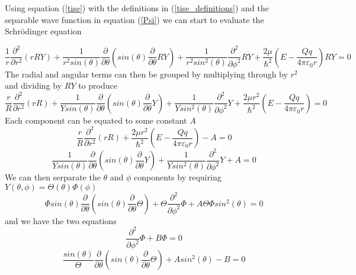 \documentclass[12pt,a4paper]{report}
\begin{document}
	Using equation (\ref{tise}) with the definitions in (\ref{tise_definitions}) and the separable wave function in equation (\ref{Psi}) we can start to evaluate the Schr{\"o}dinger equation

	\begin{equation}
		\frac{1}{r}\frac{\partial^2}{\partial r^2}\left(rRY\right)+\frac{1}{r^2 sin\left(\theta\right)}\frac{\partial}{\partial\theta}\left(sin\left(\theta\right)\frac{\partial}{\partial\theta}RY\right)+\frac{1}{r^2 sin^2\left(\theta\right)}\frac{\partial^2}{\partial\phi^2}RY+\frac{2\mu}{\hbar^2}\left(E-\frac{Qq}{4\pi\varepsilon_0 r}\right)RY=0
	\end{equation}
	The radial and angular terms can then be grouped by multiplying through by $r^2$ and dividing by $RY$ to produce
	\begin{equation}
		\frac{r}{R}\frac{\partial^2}{\partial r^2}\left(rR\right)+\frac{1}{Ysin\left(\theta\right)}\frac{\partial}{\partial\theta}\left(sin\left(\theta\right)\frac{\partial}{\partial\theta}Y\right)+\frac{1}{Ysin^2\left(\theta\right)}\frac{\partial^2}{\partial\phi^2}Y+\frac{2\mu r^2}{\hbar^2}\left(E-\frac{Qq}{4\pi\varepsilon_0 r}\right) = 0
	\end{equation}
	Each component can be equated to some constant $A$
	\begin{equation}
		\label{solve_for_E}
		\frac{r}{R}\frac{\partial^2}{\partial r^2}\left(rR\right)+\frac{2\mu r^2}{\hbar^2}\left(E-\frac{Qq}{4\pi\varepsilon_0 r}\right) -A= 0
	\end{equation}
	\begin{equation}
		\frac{1}{Ysin\left(\theta\right)}\frac{\partial}{\partial\theta}\left(sin\left(\theta\right)\frac{\partial}{\partial\theta}Y\right)+\frac{1}{Ysin^2\left(\theta\right)}\frac{\partial^2}{\partial\phi^2}Y +A = 0
	\end{equation}
	We can then serparate the $\theta$ and $\phi$ conponents by requiring $Y\left(\theta,\phi\right)=\Theta\left(\theta\right)\Phi\left(\phi\right)$
	\begin{equation}
		\Phi sin\left(\theta\right)\frac{\partial}{\partial\theta}\left(sin\left(\theta\right)\frac{\partial}{\partial\theta}\Theta\right)+\Theta\frac{\partial^2}{\partial\phi^2}\Phi + A\Theta\Phi sin^2\left(\theta\right) = 0
	\end{equation}
	and we have the two equations
	\begin{equation}
		\label{solve_for_B}
		\frac{\partial^2}{\partial\phi^2}\Phi+B\Phi = 0
	\end{equation}
	\begin{equation}
		\label{solve_for_A}
		\frac{sin\left(\theta\right)}{\Theta}\frac{\partial}{\partial\theta}\left(sin\left(\theta\right)\frac{\partial}{\partial\theta}\Theta\right)+Asin^2\left(\theta\right)-B=0
	\end{equation}
\end{document}
